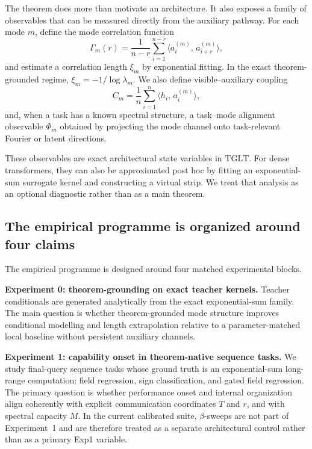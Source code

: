 \documentclass[11pt]{article}
\theoremstyle{definition}
\newcommand{\TGLT}{\ensuremath{\mathrm{TGLT}}}
\newcommand{\ip}[2]{\langle #1,\, #2 \rangle}
\begin{document}
The theorem does more than motivate an architecture. It also exposes a family of observables that can be measured directly from the auxiliary pathway. For each mode \(m\), define the mode correlation function
\begin{equation}
\Gamma_m(r)
=
\frac{1}{n-r}\sum_{i=1}^{n-r}\ip{a_i^{(m)}}{a_{i+r}^{(m)}},
\label{eq:mode-correlation}
\end{equation}
and estimate a correlation length \(\xi_m\) by exponential fitting. In the exact theorem-grounded regime, \(\xi_m=-1/\log\lambda_m\). We also define visible--auxiliary coupling
\begin{equation}
C_m=\frac{1}{n}\sum_{i=1}^{n}\ip{h_i}{a_i^{(m)}},
\label{eq:visible-aux-coupling}
\end{equation}
and, when a task has a known spectral structure, a task--mode alignment observable \(\Phi_m\) obtained by projecting the mode channel onto task-relevant Fourier or latent directions.

These observables are exact architectural state variables in \TGLT{}. For dense transformers, they can also be approximated post hoc by fitting an exponential-sum surrogate kernel and constructing a virtual strip. We treat that analysis as an optional diagnostic rather than as a main theorem.

\subsection*{The empirical programme is organized around four claims}

The empirical programme is designed around four matched experimental blocks.

\textbf{Experiment 0: theorem-grounding on exact teacher kernels.} Teacher conditionals are generated analytically from the exact exponential-sum family. The main question is whether theorem-grounded mode structure improves conditional modelling and length extrapolation relative to a parameter-matched local baseline without persistent auxiliary channels.

\textbf{Experiment 1: capability onset in theorem-native sequence tasks.} We study final-query sequence tasks whose ground truth is an exponential-sum long-range computation: field regression, sign classification, and gated field regression. The primary question is whether performance onset and internal organization align coherently with explicit communication coordinates \(T\) and \(r\), and with spectral capacity \(M\). In the current calibrated suite, \(\beta\)-sweeps are not part of Experiment~1 and are therefore treated as a separate architectural control rather than as a primary Exp1 variable.
\end{document}
